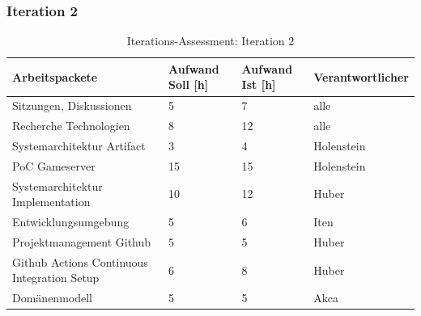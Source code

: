 \documentclass[11pt,ngerman]{article}
\begin{document}
    \subsubsection{Iteration 2}
    \begin{table}[H]
        \caption{Iterations-Assessment: Iteration 2}
        \begin{tabularx}{\textwidth}{l l l l}
            \toprule
            Arbeitspackete & Aufwand Soll [h] & Aufwand Ist [h] & Verantwortlicher \\
            \toprule
            Sitzungen, Diskussionen & 5 & 7 & alle \\
            Recherche Technologien & 8 & 12 & alle \\
            Systemarchitektur Artifact & 3 & 4 & Holenstein \\
            PoC Gameserver & 15 & 15 & Holenstein \\
            Systemarchitektur Implementation & 10 & 12 & Huber \\
            Entwicklungsumgebung & 5 & 6 & Iten \\
            Projektmanagement Github & 5 & 5 & Huber \\
            Github Actions Continuous Integration Setup & 6 & 8 & Huber \\
            Domänenmodell & 5 & 5 & Akca \\
            \bottomrule
        \end{tabularx}
        \label{tab:Iterations-Assessment: Iteration 2}
    \end{table}
\end{document}
